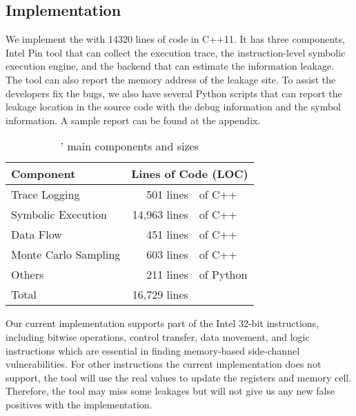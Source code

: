 \subsection{Implementation}
We implement the \tool{} with 14320 lines of code in C++11. 
It has three components, Intel
Pin tool that can collect the execution trace, 
the instruction-level symbolic execution
engine, and the backend that can estimate the information leakage. 
The tool can also report the memory address of the leakage site. 
To assist the developers fix the bugs,
we also have several Python scripts that can report the leakage 
location in the source code with the debug information and the symbol 
information. A sample report can be found at the appendix.

\begin{table}[h]
    \centering
    \caption{\tool{}' main components and sizes}
    \begin{tabular}{lr@{~}@{}l}
    \hline
    Component                            & \multicolumn{2}{c}{Lines of Code (LOC)}    \\ \hline
    Trace Logging                        & 501 lines &of C++       \\ 
    Symbolic Execution                   & 14,963 lines &of C++    \\ 
    Data Flow                            & 451 lines &of C++       \\
    Monte Carlo Sampling                 & 603 lines &of C++       \\ 
    Others                               & 211 lines &of Python    \\ \hline
    Total    & 16,729 lines & \\\hline
    \end{tabular}
\end{table}

Our current implementation supports part of the Intel 32-bit instructions, 
including bitwise operations, control transfer, data movement, and logic 
instructions which are essential in finding memory-based side-channel 
vulnerabilities. For other 
instructions the current implementation does not support, 
the tool will use the real values to update the registers and memory cell.
Therefore, the tool may miss some leakages but will not give us any new
false positives with the implementation.
